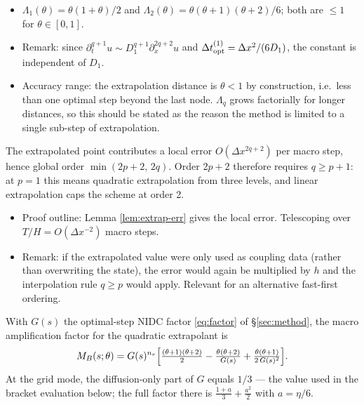 \begin{itemize}
  \item $\Lambda_1(\theta) = \theta(1+\theta)/2$ and $\Lambda_2(\theta) = \theta(\theta+1)(\theta+2)/6$; both are $\le 1$ for $\theta \in [0,1]$.
  \item Remark: since $\partial_t^{q+1} u \sim D_1^{q+1} \partial_x^{2q+2} u$ and $\Delta t_{\mathrm{opt}}^{(1)} = \Delta x^2/(6D_1)$, the constant is independent of $D_1$.
  \item Accuracy range: the extrapolation distance is $\theta < 1$ by construction, i.e.\ less than one optimal step beyond the last node. $\Lambda_q$ grows factorially for longer distances, so this should be stated as the reason the method is limited to a single sub-step of extrapolation.
\end{itemize}

\begin{theorem}\label{thm:extrap-degree}
  The extrapolated point contributes a local error $O(\Delta x^{2q+2})$ per macro step, hence global order $\min(2p+2,\,2q)$. Order $2p+2$ therefore requires $q \ge p+1$: at $p=1$ this means quadratic extrapolation from three levels, and linear extrapolation caps the scheme at order 2.
\end{theorem}

\begin{itemize}
  \item Proof outline: Lemma \ref{lem:extrap-err} gives the local error. Telescoping over $T/H = O(\Delta x^{-2})$ macro steps.
  \item Remark: if the extrapolated value were only used as coupling data (rather than overwriting the state), the error would again be multiplied by $h$ and the interpolation rule $q \ge p$ would apply. Relevant for an alternative fast-first ordering.
\end{itemize}

\begin{lemma}\label{lem:B-symbol}
  With $G(s)$ the optimal-step NIDC factor \eqref{eq:factor} of \S\ref{sec:method}, the macro amplification factor for the quadratic extrapolant is
  \[
    M_B(s;\theta) = G(s)^{n_r} \Bigl[ \tfrac{(\theta+1)(\theta+2)}{2} - \tfrac{\theta(\theta+2)}{G(s)} + \tfrac{\theta(\theta+1)}{2\,G(s)^2} \Bigr].
  \]
  At the grid mode, the diffusion-only part of $G$ equals $1/3$ --- the value used in the bracket evaluation below; the full factor there is $\frac{1+a}{3}+\frac{a^2}{2}$ with $a=\eta/6$.
\end{lemma}

